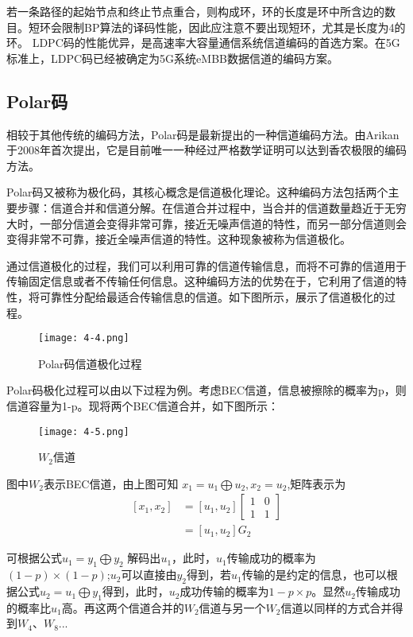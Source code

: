 \documentclass{article}
\begin{document}
若一条路径的起始节点和终止节点重合，则构成环，环的长度是环中所含边的数目。短环会限制BP算法的译码性能，因此应注意不要出现短环，尤其是长度为4的环。
LDPC码的性能优异，是高速率大容量通信系统信道编码的首选方案。在5G标准上，LDPC码已经被确定为5G系统eMBB数据信道的编码方案。\cite{yu2018channel}


\subsection{Polar码}
相较于其他传统的编码方法，Polar码是最新提出的一种信道编码方法。由Arikan于2008年首次提出，它是目前唯一一种经过严格数学证明可以达到香农极限的编码方法。

Polar码又被称为极化码，其核心概念是信道极化理论。这种编码方法包括两个主要步骤：信道合并和信道分解。在信道合并过程中，当合并的信道数量趋近于无穷大时，一部分信道会变得非常可靠，接近无噪声信道的特性，而另一部分信道则会变得非常不可靠，接近全噪声信道的特性。这种现象被称为信道极化。

通过信道极化的过程，我们可以利用可靠的信道传输信息，而将不可靠的信道用于传输固定信息或者不传输任何信息。这种编码方法的优势在于，它利用了信道的特性，将可靠性分配给最适合传输信息的信道。如下图所示，展示了信道极化的过程。

\begin{figure}[h]
  \centering
  \texttt{[image: 4-4.png]}
  \caption{Polar码信道极化过程}
\end{figure}

Polar码极化过程可以由以下过程为例。考虑BEC信道，信息被擦除的概率为p，则信道容量为1-p。现将两个BEC信道合并，如下图所示：

\begin{figure}[h]
  \centering
  \texttt{[image: 4-5.png]}
  \caption{$W_2$信道}
\end{figure}

图中$W_2$表示BEC信道，由上图可知 $x_1 = u_1 \bigoplus u_2, x_2 = u_2$,矩阵表示为
\begin{equation}
    \begin{align*}
        [x_1, x_2] &= [u_1, u_2] \begin{bmatrix} 1 & 0 \\ 1 & 1 \end{bmatrix} \\
        &= [u_1, u_2]G_2
    \end{align*}
\end{equation}


可根据公式$u_1 = y_1 \bigoplus y_2$ 解码出$u_1$，此时，$u_1$传输成功的概率为$(1-p) \times (1-p)$;$u_2$可以直接由$y_2$得到，若$u_1$传输的是约定的信息，也可以根据公式$u_2 = u_1 \bigoplus y_1$得到，此时，$u_2$成功传输的概率为$1-p\times p$。显然$u_2$传输成功的概率比$u_1$高。再这两个信道合并的$W_2$信道与另一个$W_2$信道以同样的方式合并得到$W_4$、$W_8$...
\end{document}
